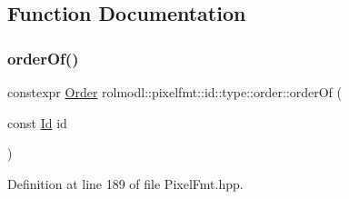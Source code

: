 \subsection{Function Documentation}
\mbox{\label{namespacerolmodl_1_1pixelfmt_1_1id_1_1type_1_1order_a509dae39ae8be612b6829f6a3bdf355a}} 
\subsubsection{\texorpdfstring{orderOf()}{orderOf()}}
{\footnotesize\ttfamily constexpr \mbox{\hyperlink{namespacerolmodl_1_1pixelfmt_1_1id_1_1type_a01a03db37a556bc98643bd88b2f5b6b3}{Order}} rolmodl\+::pixelfmt\+::id\+::type\+::order\+::order\+Of (\begin{DoxyParamCaption}\item[{const \mbox{\hyperlink{namespacerolmodl_1_1pixelfmt_a96282713e4465ba9211c8fd3a702b52b}{Id}}}]{id }\end{DoxyParamCaption})\hspace{0.3cm}{\ttfamily [noexcept]}}



Definition at line 189 of file Pixel\+Fmt.\+hpp.

